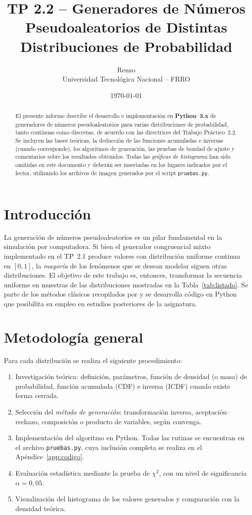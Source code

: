 \documentclass[11pt,a4paper]{article}
\title{TP 2.2 -- Generadores de Números Pseudoaleatorios de Distintas Distribuciones de Probabilidad}
\author{Renzo \\ Universidad Tecnológica Nacional -- FRRO}
\date{\today}
\begin{document}
\maketitle

\begin{abstract}
El presente informe describe el desarrollo e implementación en \textbf{Python~3.x} de generadores de números
pseudoaleatorios para varias distribuciones de probabilidad, tanto continuas como discretas, de acuerdo con las
directrices del Trabajo Práctico~2.2.
Se incluyen las bases teóricas, la deducción de las funciones acumuladas e inversas (cuando corresponde),
los algoritmos de generación, las pruebas de bondad de ajuste y comentarios sobre los resultados obtenidos.
Todas las \emph{gráficas de histograma} han sido omitidas en este documento y deberán ser insertadas en los lugares
indicados por el lector, utilizando los archivos de imagen generados por el script \texttt{pruebas.py}.
\end{abstract}

\section{Introducción}
La generación de números pseudoaleatorios es un pilar fundamental en la simulación por computadora.
Si bien el generador congruencial mixto implementado en el TP~2.1 produce valores con distribución uniforme
continua en $[0,1]$, la \emph{mayoría} de los fenómenos que se desean modelar siguen otras distribuciones.
El objetivo de este trabajo es, entonces, transformar la secuencia uniforme en muestras de
las distribuciones mostradas en la Tabla~\ref{tab:listado}.
Se parte de los métodos clásicos recopilados por \cite{naylor1982} y se
desarrolla código en Python que posibilita su empleo en estudios posteriores de la asignatura.

\section{Metodología general}
Para cada distribución se realiza el siguiente procedimiento:
\begin{enumerate}
    \item Investigación teórica: definición, parámetros, función de densidad (o masa) de probabilidad, 
    función acumulada (CDF) e inversa (ICDF) cuando existe forma cerrada.
    \item Selección del \emph{método de generación}: transformación inversa, aceptación--rechazo, 
    composición o producto de variables, según convenga.
    \item Implementación del algoritmo en Python.  
    Todas las rutinas se encuentran en el archivo \texttt{pruebas.py},
    cuya inclusión completa se realiza en el Apéndice~\ref{app:codigo}.
    \item Evaluación estadística mediante la prueba de $\chi^{2}$, con un nivel de significancia
    $\alpha = 0{,}05$.
    \item Visualización del histograma de los valores generados y comparación con la densidad teórica.
\end{enumerate}
\end{document}
